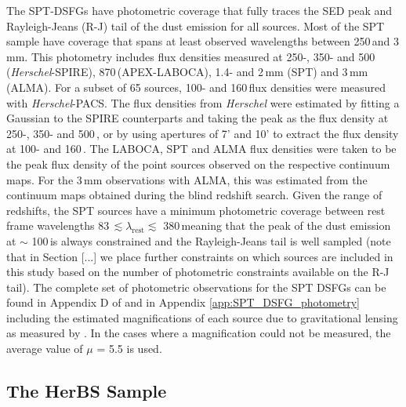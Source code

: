 The SPT-DSFGs have photometric coverage that fully traces the SED peak and Rayleigh-Jeans (R-J) tail of the dust emission for all sources. Most of the SPT sample have coverage that spans at least observed wavelengths between 250\,\micron and 3\,mm. This photometry includes flux densities measured at 250-, 350- and 500\,\micron (\textit{Herschel}-SPIRE), 870\,\micron (APEX-LABOCA), 1.4- and 2\,mm (SPT) and 3\,mm (ALMA). For a subset of 65 sources, 100- and 160\,\micron flux densities were measured with \textit{Herschel}-PACS. The flux densities from \textit{Herschel} were estimated by fitting a Gaussian to the SPIRE counterparts and taking the peak as the flux density at 250-, 350- and 500\,\micron, or by using apertures of 7' and 10' to extract the flux density at 100- and 160\,\micron. The LABOCA, SPT and ALMA flux densities were taken to be the peak flux density of the point sources observed on the respective continuum maps. For the 3\,mm observations with ALMA, this was estimated from the continuum maps obtained during the blind redshift search. Given the range of redshifts, the SPT sources have a minimum photometric coverage between rest frame wavelengths 83\,\micron $\lesssim \lambda_{\textrm{rest}} \lesssim$ 380\,\micron meaning that the peak of the dust emission at $\sim$ 100\,\micron is always constrained and the Rayleigh-Jeans tail is well sampled (note that in Section [...] we place further constraints on which sources are included in this study based on the number of photometric constraints available on the R-J tail). The complete set of photometric observations for the SPT DSFGs can be found in Appendix D of \citealt{Reuter_2020} and in Appendix \ref{app:SPT_DSFG_photometry} including the estimated magnifications of each source due to gravitational lensing as measured by \citealt{Spilker_2016}. In the cases where a magnification could not be measured, the average value of $\mu$ = 5.5 is used.

\subsection{The HerBS Sample}


